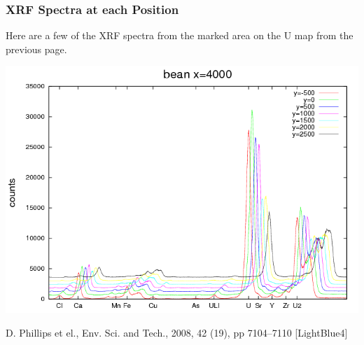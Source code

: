 \documentclass[10pt, xcolor=x11names, compress]{beamer}
\begin{document}
\begin{frame}
  \frametitle{XRF Spectra at each Position}

  Here are a few of the XRF spectra from the marked area on the U map
  from the previous page.
  \begin{center}
    \includegraphics[width=0.7\linewidth]{xrf/beanx=4000.png}
  \end{center}
  \begin{bottomnote}[0.5][19.75]
    D. Phillips et el., Env. Sci. and Tech., 2008, 42 (19), pp
    7104–7110
    [LightBlue4]
  \end{bottomnote}
\end{frame}
\end{document}
